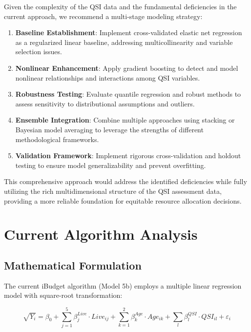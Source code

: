 \documentclass[12pt]{article}
\begin{document}
Given the complexity of the QSI data and the fundamental deficiencies in the current approach, we recommend a multi-stage modeling strategy:

\begin{enumerate}
    \item \textbf{Baseline Establishment}: Implement cross-validated elastic net regression as a regularized linear baseline, addressing multicollinearity and variable selection issues.
    
    \item \textbf{Nonlinear Enhancement}: Apply gradient boosting to detect and model nonlinear relationships and interactions among QSI variables.
    
    \item \textbf{Robustness Testing}: Evaluate quantile regression and robust methods to assess sensitivity to distributional assumptions and outliers.
    
    \item \textbf{Ensemble Integration}: Combine multiple approaches using stacking or Bayesian model averaging to leverage the strengths of different methodological frameworks.
    
    \item \textbf{Validation Framework}: Implement rigorous cross-validation and holdout testing to ensure model generalizability and prevent overfitting.
\end{enumerate}

This comprehensive approach would address the identified deficiencies while fully utilizing the rich multidimensional structure of the QSI assessment data, providing a more reliable foundation for equitable resource allocation decisions.


\section{Current Algorithm Analysis}

\subsection{Mathematical Formulation}

The current iBudget algorithm (Model 5b) employs a multiple linear regression model with square-root transformation:

\begin{equation}
\sqrt{Y_i} = \beta_0 + \sum_{j=1}^{5} \beta_j^{Live} \cdot Live_{ij} + \sum_{k=1}^{2} \beta_k^{Age} \cdot Age_{ik} + \sum_{l} \beta_l^{QSI} \cdot QSI_{il} + \varepsilon_i
\end{equation}
\end{document}
